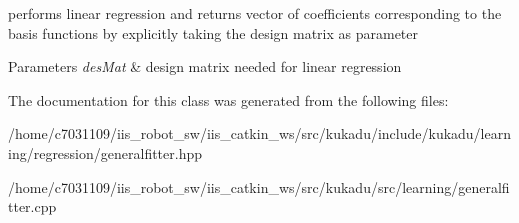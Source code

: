 performs linear regression and returns vector of coefficients corresponding to the basis functions by explicitly taking the design matrix as parameter 


\begin{DoxyParams}{Parameters}
{\em des\-Mat} & design matrix needed for linear regression \\
\hline
\end{DoxyParams}


The documentation for this class was generated from the following files\-:\begin{DoxyCompactItemize}
\item 
/home/c7031109/iis\-\_\-robot\-\_\-sw/iis\-\_\-catkin\-\_\-ws/src/kukadu/include/kukadu/learning/regression/generalfitter.\-hpp\item 
/home/c7031109/iis\-\_\-robot\-\_\-sw/iis\-\_\-catkin\-\_\-ws/src/kukadu/src/learning/generalfitter.\-cpp\end{DoxyCompactItemize}

